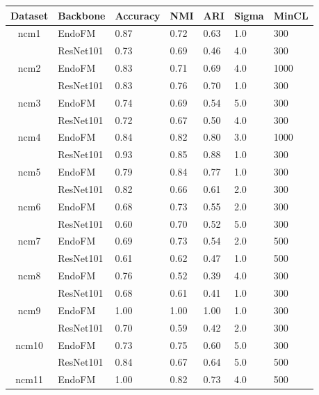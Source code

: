 \begin{table}[h]
\small
\setlength\tabcolsep{3pt}
    \centering
    \vspace{-0.05in}
    \begin{tabular}{cllllll}
    \toprule
        Dataset & Backbone & Accuracy & NMI & ARI & Sigma & MinCL \\
        \midrule
    \multirow{2}{*}{ncm1}
 & EndoFM & 0.87 & 0.72 & 0.63 & 1.0 & 300 \\
     & ResNet101 & 0.73 & 0.69 & 0.46 & 4.0 & 300 \\
    \midrule
    \multirow{2}{*}{ncm2}
 & EndoFM & 0.83 & 0.71 & 0.69 & 4.0 & 1000 \\
     & ResNet101 & 0.83 & 0.76 & 0.70 & 1.0 & 300 \\
    \midrule
    \multirow{2}{*}{ncm3}
 & EndoFM & 0.74 & 0.69 & 0.54 & 5.0 & 300 \\
     & ResNet101 & 0.72 & 0.67 & 0.50 & 4.0 & 300 \\
    \midrule
    \multirow{2}{*}{ncm4}
 & EndoFM & 0.84 & 0.82 & 0.80 & 3.0 & 1000 \\
     & ResNet101 & 0.93 & 0.85 & 0.88 & 1.0 & 300 \\
    \midrule
    \multirow{2}{*}{ncm5}
 & EndoFM & 0.79 & 0.84 & 0.77 & 1.0 & 300 \\
     & ResNet101 & 0.82 & 0.66 & 0.61 & 2.0 & 300 \\
    \midrule
    \multirow{2}{*}{ncm6}
 & EndoFM & 0.68 & 0.73 & 0.55 & 2.0 & 300 \\
     & ResNet101 & 0.60 & 0.70 & 0.52 & 5.0 & 300 \\
    \midrule
    \multirow{2}{*}{ncm7}
 & EndoFM & 0.69 & 0.73 & 0.54 & 2.0 & 500 \\
     & ResNet101 & 0.61 & 0.62 & 0.47 & 1.0 & 500 \\
    \midrule
    \multirow{2}{*}{ncm8}
 & EndoFM & 0.76 & 0.52 & 0.39 & 4.0 & 300 \\
     & ResNet101 & 0.68 & 0.61 & 0.41 & 1.0 & 300 \\
    \midrule
    \multirow{2}{*}{ncm9}
 & EndoFM & 1.00 & 1.00 & 1.00 & 1.0 & 300 \\
     & ResNet101 & 0.70 & 0.59 & 0.42 & 2.0 & 300 \\
    \midrule
    \multirow{2}{*}{ncm10}
 & EndoFM & 0.73 & 0.75 & 0.60 & 5.0 & 300 \\
     & ResNet101 & 0.84 & 0.67 & 0.64 & 5.0 & 500 \\
    \midrule
    \multirow{2}{*}{ncm11}
 & EndoFM & 1.00 & 0.82 & 0.73 & 4.0 & 500 \\

\end{tabular}
\end{table}
